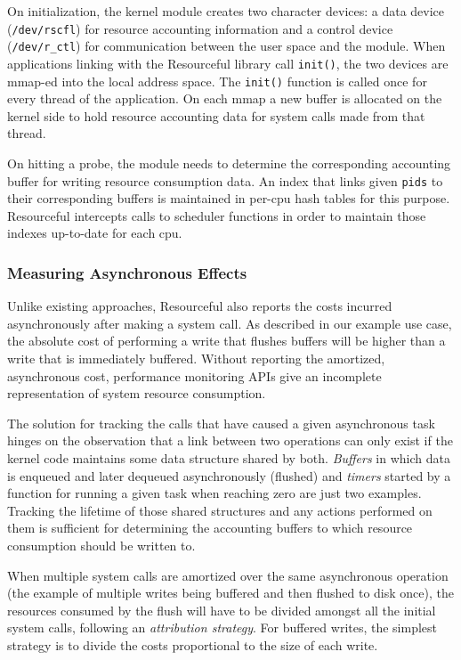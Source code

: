 \documentclass[letterpaper,twocolumn,10pt]{article}
\newcommand{\pname}{Resourceful}
\begin{document}
On initialization, the kernel module creates two character devices: a data
device (\texttt{/dev/rscfl}) for resource accounting information and a control
device (\texttt{/dev/r\_ctl}) for communication between the user space and the
module. When applications linking with the \pname{ }library call
\texttt{init()}, the two devices are mmap-ed into the local address space. The
\texttt{init()} function is called once for every thread of the application. On
each mmap a new buffer is allocated on the kernel side to hold resource
accounting data for system calls made from that thread.

On hitting a probe, the module needs to determine the corresponding accounting
buffer for writing resource consumption data. An index that links given \texttt{pids} to
their corresponding buffers is maintained in per-cpu hash tables for this
purpose. \pname{ } intercepts calls to scheduler functions in order to maintain
those indexes up-to-date for each cpu.

\subsubsection{Measuring Asynchronous Effects}
Unlike existing approaches, \pname{} also reports the costs incurred
asynchronously after making a system call. As described in our example use case,
the absolute cost of performing a write that flushes buffers will be higher than
a write that is immediately buffered. Without reporting the amortized,
asynchronous cost, performance monitoring APIs give an incomplete representation
of system resource consumption.

The solution for tracking the calls that have caused a given asynchronous task
hinges on the observation that a link between two operations can only exist if
the kernel code maintains some data structure shared by both. \textit{Buffers}
in which data is enqueued and later dequeued asynchronously (flushed) and
\textit{timers} started by a function for running a given task when reaching
zero are just two examples. Tracking the lifetime of those shared structures and
any actions performed on them is sufficient for determining the accounting
buffers to which resource consumption should be written to. 

When multiple system calls are amortized over the same asynchronous operation
(the example of multiple writes being buffered and then flushed to disk once),
the resources consumed by the flush will have to be divided amongst all the
initial system calls, following an \textit{attribution strategy}. For buffered writes,
the simplest strategy is to divide the costs proportional to the size of each
write.
\end{document}
